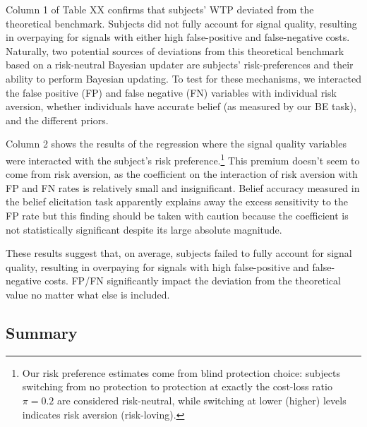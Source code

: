 \documentclass[12pt,a4paper]{article}
\begin{document}





Column 1 of Table XX confirms that subjects’ WTP deviated from the theoretical benchmark. Subjects did not fully account for signal quality, resulting in overpaying for signals with either high false-positive and false-negative costs. Naturally, two potential sources of deviations from this theoretical benchmark based on a risk-neutral Bayesian updater are subjects’ risk-preferences and their ability to perform Bayesian updating. To test for these mechanisms, we interacted the false positive (FP) and false negative (FN) variables with individual risk aversion, whether individuals have accurate belief (as measured by our BE task), and the different priors.

Column 2 shows the results of the regression where the signal quality variables were interacted with the subject’s risk preference.\footnote{Our risk preference estimates come from blind protection choice: subjects switching from no protection to protection at exactly the cost-loss ratio $\pi=0.2$ are considered risk-neutral, while switching at lower (higher) levels indicates risk aversion (risk-loving).} This premium doesn’t seem to come from risk aversion, as the coefficient on the interaction of risk aversion with FP and FN rates is relatively small and insignificant. Belief accuracy measured in the belief elicitation task apparently explains away the excess sensitivity to the FP rate but this finding should be taken with caution because the coefficient is not statistically significant despite its large absolute magnitude.

These results suggest that, on average, subjects failed to fully account for signal quality, resulting in overpaying for signals with high false-positive and false-negative costs.  FP/FN significantly impact the deviation from the theoretical value no matter what else is included.  



\subsection{Summary}
\end{document}
